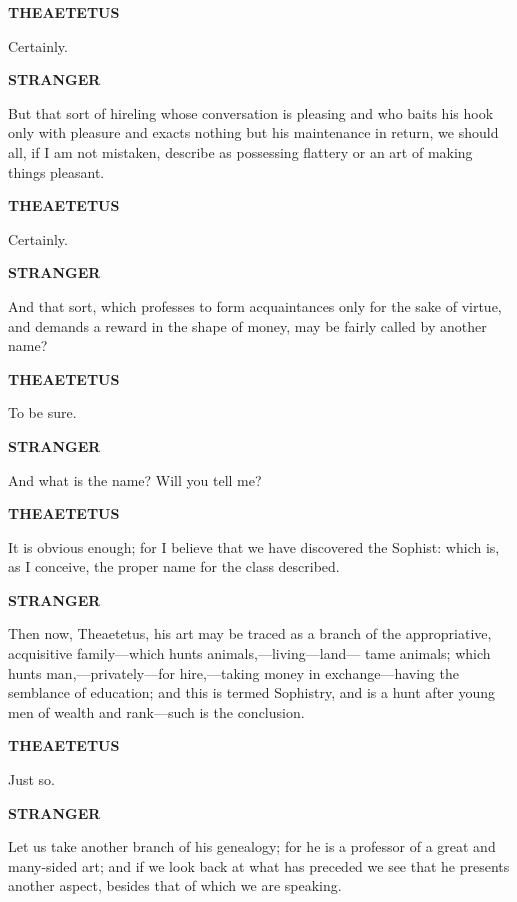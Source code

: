 \documentclass[11pt,letter]{article}
\begin{document}
\par \textbf{THEAETETUS}
\par   Certainly.

\par \textbf{STRANGER}
\par   But that sort of hireling whose conversation is pleasing and who baits his hook only with pleasure and exacts nothing but his maintenance in return, we should all, if I am not mistaken, describe as possessing flattery or an art of making things pleasant.

\par \textbf{THEAETETUS}
\par   Certainly.

\par \textbf{STRANGER}
\par   And that sort, which professes to form acquaintances only for the sake of virtue, and demands a reward in the shape of money, may be fairly called by another name?

\par \textbf{THEAETETUS}
\par   To be sure.

\par \textbf{STRANGER}
\par   And what is the name? Will you tell me?

\par \textbf{THEAETETUS}
\par   It is obvious enough; for I believe that we have discovered the Sophist:  which is, as I conceive, the proper name for the class described.

\par \textbf{STRANGER}
\par   Then now, Theaetetus, his art may be traced as a branch of the appropriative, acquisitive family—which hunts animals,—living—land— tame animals; which hunts man,—privately—for hire,—taking money in exchange—having the semblance of education; and this is termed Sophistry, and is a hunt after young men of wealth and rank—such is the conclusion.

\par \textbf{THEAETETUS}
\par   Just so.

\par \textbf{STRANGER}
\par   Let us take another branch of his genealogy; for he is a professor of a great and many-sided art; and if we look back at what has preceded we see that he presents another aspect, besides that of which we are speaking.
\end{document}
